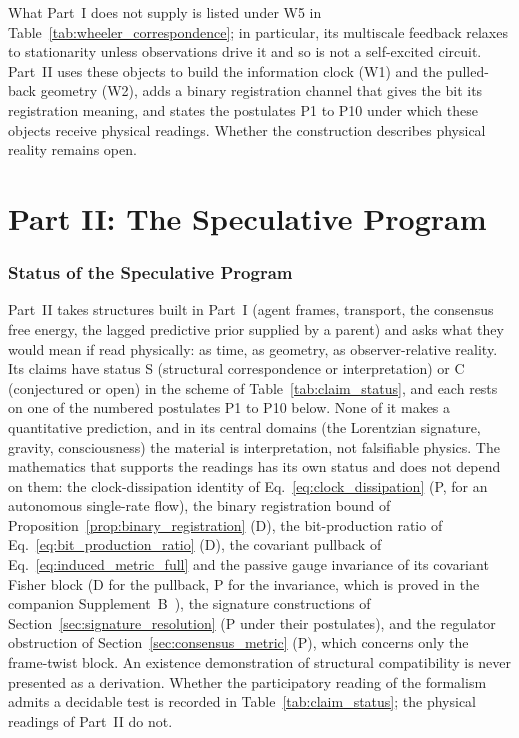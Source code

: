 \documentclass[11pt]{article}
\begin{document}
What Part~I does not supply is listed under W5 in Table~\ref{tab:wheeler_correspondence}; in particular, its multiscale feedback relaxes to stationarity unless observations drive it and so is not a self-excited circuit. Part~II uses these objects to build the information clock (W1) and the pulled-back geometry (W2), adds a binary registration channel that gives the bit its registration meaning, and states the postulates P1 to P10 under which these objects receive physical readings. Whether the construction describes physical reality remains open.

\part*{Part II: The Speculative Program}

\section{Status of the Speculative Program}\label{sec:part2_preamble}

Part~II takes structures built in Part~I (agent frames, transport, the consensus free energy, the lagged predictive prior supplied by a parent) and asks what they would mean if read physically: as time, as geometry, as observer-relative reality. Its claims have status S (structural correspondence or interpretation) or C (conjectured or open) in the scheme of Table~\ref{tab:claim_status}, and each rests on one of the numbered postulates P1 to P10 below. None of it makes a quantitative prediction, and in its central domains (the Lorentzian signature, gravity, consciousness) the material is interpretation, not falsifiable physics. The mathematics that supports the readings has its own status and does not depend on them: the clock-dissipation identity of Eq.~\eqref{eq:clock_dissipation} (P, for an autonomous single-rate flow), the binary registration bound of Proposition~\ref{prop:binary_registration} (D), the bit-production ratio of Eq.~\eqref{eq:bit_production_ratio} (D), the covariant pullback of Eq.~\eqref{eq:induced_metric_full} and the passive gauge invariance of its covariant Fisher block (D for the pullback, P for the invariance, which is proved in the companion Supplement~B~\cite[Ch.~B2]{DennisGaugeVFESuppB2026}), the signature constructions of Section~\ref{sec:signature_resolution} (P under their postulates), and the regulator obstruction of Section~\ref{sec:consensus_metric} (P), which concerns only the frame-twist block. An existence demonstration of structural compatibility is never presented as a derivation. Whether the participatory reading of the formalism admits a decidable test is recorded in Table~\ref{tab:claim_status}; the physical readings of Part~II do not.
\end{document}
